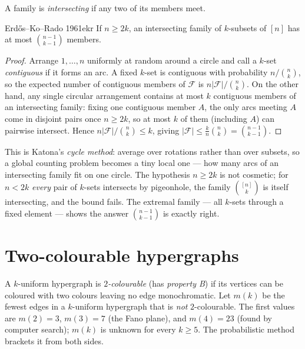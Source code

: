 A family is \emph{intersecting} if any two of its members meet.

\begin{theorem}{Erd\H{o}s--Ko--Rado 1961}{ekr}
If $n\ge 2k$, an intersecting family of $k$-subsets of $[n]$ has at most
$\binom{n-1}{k-1}$ members.
\end{theorem}

\begin{proof}
Arrange $1,\dots,n$ uniformly at random around a circle and call a $k$-set
\emph{contiguous} if it forms an arc. A fixed $k$-set is contiguous with
probability $n/\binom nk$, so the expected number of contiguous members of
$\mathcal F$ is $n|\mathcal F|/\binom nk$. On the other hand, any single
circular arrangement contains at most $k$ contiguous members of an intersecting
family: fixing one contiguous member $A$, the only arcs meeting $A$ come in
disjoint pairs once $n\ge 2k$, so at most $k$ of them (including $A$) can
pairwise intersect. Hence $n|\mathcal F|/\binom nk\le k$, giving
$|\mathcal F|\le\tfrac kn\binom nk=\binom{n-1}{k-1}$.
\end{proof}

\begin{insight}
This is Katona's \emph{cycle method}: average over rotations rather than over
subsets, so a global counting problem becomes a tiny local one --- how many
arcs of an intersecting family fit on one circle. The hypothesis $n\ge2k$ is
not cosmetic; for $n<2k$ \emph{every} pair of $k$-sets intersects by
pigeonhole, the family $\binom{[n]}{k}$ is itself intersecting, and the bound
fails. The extremal family --- all $k$-sets through a fixed element --- shows
the answer $\binom{n-1}{k-1}$ is exactly right.
\end{insight}

\section{Two-colourable hypergraphs}

A $k$-uniform hypergraph is \emph{$2$-colourable} (has \emph{property B}) if its
vertices can be coloured with two colours leaving no edge monochromatic. Let
$m(k)$ be the fewest edges in a $k$-uniform hypergraph that is \emph{not}
$2$-colourable. The first values are $m(2)=3$, $m(3)=7$ (the Fano plane), and
$m(4)=23$ (found by computer search); $m(k)$ is unknown for every $k\ge5$. The
probabilistic method brackets it from both sides.

